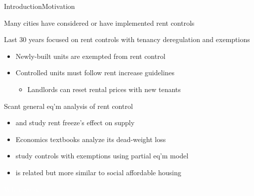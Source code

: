 \documentclass[11pt,aspectratio=169]{beamer}
\begin{document}
\begin{frame}{Introduction}{Motivation}

Many cities have considered or have implemented rent controls \citep{fraser-1981}

\vspace{0.5cm}

Last 30 years focused on rent controls with tenancy deregulation and exemptions
\begin{itemize}
    \item Newly-built units are exempted from rent control
    \item Controlled units must follow rent increase guidelines 
    \begin{itemize}
        \item Landlords can reset rental prices with new tenants
    \end{itemize}
\end{itemize}

\vspace{0.5cm}

Scant general eq'm analysis of rent control \citep{diamond-2019}
\begin{itemize}
    \item \citet{hayek-1929} and \citet{fs-1946} study rent freeze's effect on supply
    \item  Economics textbooks analyze its dead-weight loss
    \item \citet{fallis-1985} study controls with exemptions using partial eq'm model
    \item \citet{fmn-2022} is related but more similar to social affordable housing
\end{itemize}
\end{frame}

{
\begin{frame}{}

\centering \Large
\textcolor{white}{What we do}
    
\end{frame}

}
\end{document}
